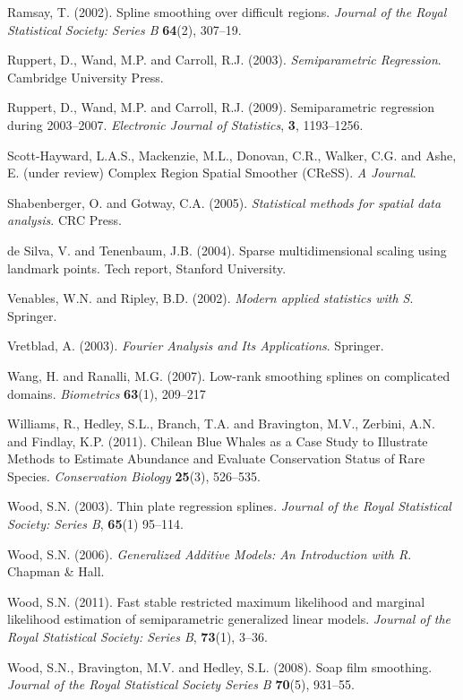 \documentclass[useAMS, referee]{biom}
\begin{document}
\begin{thebibliography}{99}
\bibitem{} Ramsay, T. (2002). Spline smoothing over difficult regions. \textit{Journal of the Royal Statistical Society: Series B} \textbf{64}(2), 307--19.

\bibitem{} Ruppert, D., Wand, M.P. and Carroll, R.J. (2003). \textit{Semiparametric Regression}. Cambridge University Press.

\bibitem{} Ruppert, D., Wand, M.P. and Carroll, R.J. (2009). Semiparametric regression during 2003--2007. \textit{Electronic Journal of Statistics}, \textbf{3}, 1193--1256.

\bibitem{} Scott-Hayward, L.A.S., Mackenzie, M.L., Donovan, C.R., Walker, C.G. and Ashe, E. (under review) Complex Region Spatial Smoother (CReSS). \textit{A Journal}.

\bibitem{} Shabenberger, O. and Gotway, C.A. (2005). \textit{Statistical methods for spatial data analysis}. CRC Press.

\bibitem{} de Silva, V. and Tenenbaum, J.B. (2004). Sparse multidimensional scaling using landmark points. Tech report, Stanford University.

\bibitem{} Venables, W.N. and Ripley, B.D. (2002). \textit{Modern applied statistics with S}. Springer.

\bibitem{} Vretblad, A. (2003). \textit{Fourier Analysis and Its Applications}. Springer.

\bibitem{} Wang, H. and Ranalli, M.G. (2007). Low-rank smoothing splines on complicated domains. \textit{Biometrics} \textbf{63}(1), 209--217

\bibitem{} Williams, R., Hedley, S.L., Branch, T.A. and Bravington, M.V., Zerbini, A.N. and Findlay, K.P. (2011). Chilean Blue Whales as a Case Study to Illustrate Methods to Estimate Abundance and Evaluate Conservation Status of Rare Species. \textit{Conservation Biology} \textbf{25}(3), 526--535.

\bibitem{} Wood, S.N. (2003). Thin plate regression splines. \textit{Journal of the Royal Statistical Society: Series B}, \textbf{65}(1) 95--114.

\bibitem{} Wood, S.N. (2006). \textit{Generalized Additive Models: An Introduction with R}. Chapman \& Hall.

\bibitem{} Wood, S.N. (2011). Fast stable restricted maximum likelihood and marginal likelihood estimation of semiparametric generalized linear models. \textit{Journal of the Royal Statistical Society: Series B}, \textbf{73}(1), 3--36.

\bibitem{} Wood, S.N., Bravington, M.V. and Hedley, S.L. (2008). Soap film smoothing. \textit{Journal of the Royal Statistical Society Series B} \textbf{70}(5), 931--55.

\end{thebibliography}


\label{lastpage}
\end{document}

